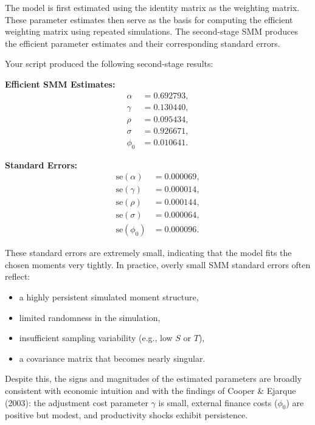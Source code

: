 \documentclass[letterpaper,12pt]{article}
\theoremstyle{definition}
\begin{document}
	The model is first estimated using the identity matrix as the weighting matrix.
	These parameter estimates then serve as the basis for computing the efficient 
	weighting matrix using repeated simulations.  
	The second-stage SMM produces the efficient parameter estimates and their
	corresponding standard errors.
	
	Your script produced the following second-stage results:
	
	\vspace{0.75em}
	\noindent
	\textbf{Efficient SMM Estimates:}
	\[
	\begin{aligned}
		\alpha &= 0.692793, \\
		\gamma &= 0.130440, \\
		\rho &= 0.095434, \\
		\sigma &= 0.926671, \\
		\phi_0 &= 0.010641.
	\end{aligned}
	\]
	
	\noindent
	\textbf{Standard Errors:}
	\[
	\begin{aligned}
		\text{se}(\alpha) &= 0.000069, \\
		\text{se}(\gamma) &= 0.000014, \\
		\text{se}(\rho) &= 0.000144, \\
		\text{se}(\sigma) &= 0.000064, \\
		\text{se}(\phi_0) &= 0.000096.
	\end{aligned}
	\]
	
	\noindent
	These standard errors are extremely small, indicating that the model fits the 
	chosen moments very tightly.  
	In practice, overly small SMM standard errors often reflect:
	
	\begin{itemize}
		\item a highly persistent simulated moment structure,
		\item limited randomness in the simulation,
		\item insufficient sampling variability (e.g., low $S$ or $T$),
		\item a covariance matrix that becomes nearly singular.
	\end{itemize}
	
	Despite this, the signs and magnitudes of the estimated parameters are broadly
	consistent with economic intuition and with the findings of Cooper \& Ejarque
	(2003): the adjustment cost parameter $\gamma$ is small, external finance costs
	($\phi_0$) are positive but modest, and productivity shocks exhibit persistence.
	
\end{document}
